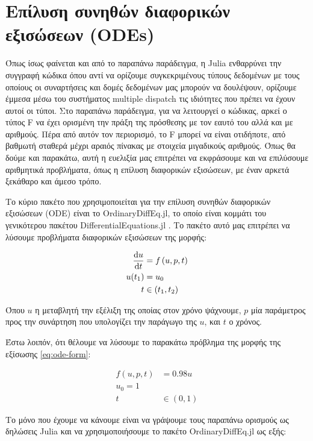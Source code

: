 \section{Επίλυση συνηθών διαφορικών εξισώσεων (ODEs)}

Όπως ίσως φαίνεται και από το παραπάνω παράδειγμα, η Julia ενθαρρύνει την συγγραφή κώδικα όπου αντί να ορίζουμε συγκεκριμένους τύπους δεδομένων με τους οποίους οι συναρτήσεις και δομές δεδομένων μας μπορούν να δουλέψουν, ορίζουμε έμμεσα μέσω του συστήματος multiple dispatch τις ιδιότητες που πρέπει να έχουν αυτοί οι τύποι.
Στο παραπάνω παράδειγμα, για να λειτουργεί ο κώδικας, αρκεί ο τύπος F να έχει ορισμένη την πράξη της πρόσθεσης με τον εαυτό του αλλά και με αριθμούς.
Πέρα από αυτόν τον περιορισμό, το F μπορεί να είναι οτιδήποτε, από βαθμωτή σταθερά μέχρι αραιός πίνακας με στοιχεία μιγαδικούς αριθμούς.
Όπως θα δούμε και παρακάτω, αυτή η ευελιξία μας επιτρέπει να εκφράσουμε και να επιλύσουμε αριθμητικά προβλήματα, όπως η επίλυση διαφορικών εξισώσεων, με έναν αρκετά ξεκάθαρο και άμεσο τρόπο.

Το κύριο πακέτο που χρησιμοποιείται για την επίλυση συνηθών διαφορικών εξισώσεων (ODE) είναι το OrdinaryDiffEq.jl, το οποίο είναι κομμάτι του γενικότερου πακέτου DifferentialEquations.jl \cite{Rackauckas2017}.
Το πακέτο αυτό μας επιτρέπει να λύσουμε προβλήματα διαφορικών εξισώσεων της μορφής:

\begin{align}
    \label{eq:ode-form}
    \frac{\mathrm{d}u}{\mathrm{d}t} &= f \left( u, p, t \right) \\
    u(t_1) &= u_0 \notag \\
    t &\in \left(t_1, t_2\right) \notag
\end{align}

Όπου $u$ η μεταβλητή την εξέλιξη της οποίας στον χρόνο ψάχνουμε, $p$ μία παράμετρος προς την συνάρτηση που υπολογίζει την παράγωγο της $u$, και $t$ ο χρόνος.

Έστω λοιπόν, ότι θέλουμε να λύσουμε το παρακάτω πρόβλημα της μορφής της εξίσωσης \eqref{eq:ode-form}:

\begin{align*}
    f(u, p, t) &= 0.98u \\
    u_0 = 1 \\
    t &\in (0, 1)
\end{align*}

Το μόνο που έχουμε να κάνουμε είναι να γράψουμε τους παραπάνω ορισμούς ως δηλώσεις Julia και να χρησιμοποιήσουμε το πακέτο OrdinaryDiffEq.jl ως εξής:

